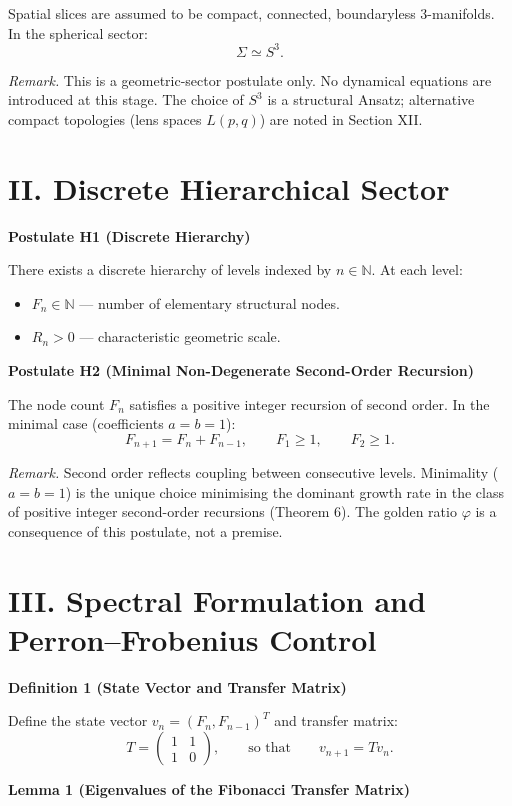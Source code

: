 \documentclass[12pt]{article}
\newcommand{\ph}{\varphi}
\newcommand{\N}{\mathbb{N}}
\begin{document}
Spatial slices are assumed to be compact, connected, boundaryless 3-manifolds. In the spherical sector:
\[
\Sigma \simeq S^3.
\]

\textit{Remark.} This is a geometric-sector postulate only. No dynamical equations are introduced at this stage. The choice of $S^3$ is a structural Ansatz; alternative compact topologies (lens spaces $L(p,q)$) are noted in Section XII.

\section*{II. Discrete Hierarchical Sector}
\textbf{Postulate H1 (Discrete Hierarchy)}

There exists a discrete hierarchy of levels indexed by $n \in \N$. At each level:
\begin{itemize}[leftmargin=2em]
    \item $F_n \in \N$ --- number of elementary structural nodes.
    \item $R_n > 0$ --- characteristic geometric scale.
\end{itemize}

\textbf{Postulate H2 (Minimal Non-Degenerate Second-Order Recursion)}

The node count $F_n$ satisfies a positive integer recursion of second order. In the minimal case (coefficients $a=b=1$):
\[
F_{n+1}=F_n+F_{n-1}, \qquad F_1\ge 1, \qquad F_2\ge 1.
\]

\textit{Remark.} Second order reflects coupling between consecutive levels. Minimality ($a=b=1$) is the unique choice minimising the dominant growth rate in the class of positive integer second-order recursions (Theorem 6). The golden ratio $\ph$ is a consequence of this postulate, not a premise.

\section*{III. Spectral Formulation and Perron--Frobenius Control}
\textbf{Definition 1 (State Vector and Transfer Matrix)}

Define the state vector $v_n=(F_n,F_{n-1})^T$ and transfer matrix:
\[
T=\begin{pmatrix}1&1\\[2pt]1&0\end{pmatrix}, \qquad \text{so that} \qquad v_{n+1}=T v_n.
\]

\textbf{Lemma 1 (Eigenvalues of the Fibonacci Transfer Matrix)}
\end{document}
